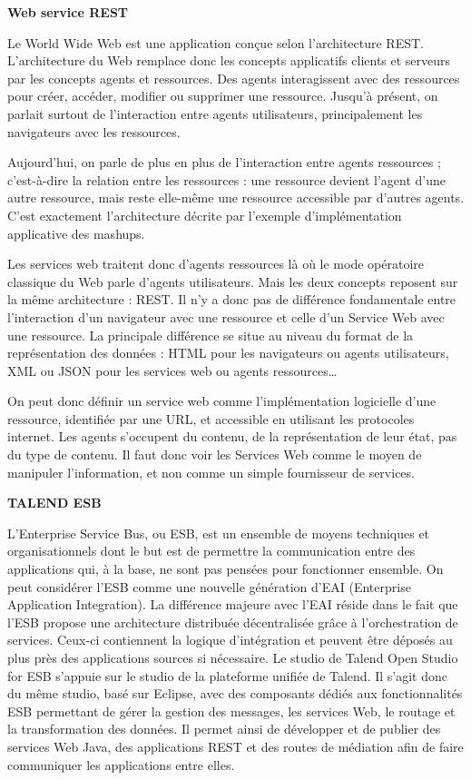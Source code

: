 \textbf{Web service REST}

Le World Wide Web est une application conçue selon l'architecture REST. L'architecture du Web remplace donc les concepts applicatifs clients et serveurs par les concepts agents et ressources. Des agents interagissent avec des ressources pour créer, accéder, modifier ou supprimer une ressource. Jusqu'à présent, on parlait surtout de l'interaction entre agents utilisateurs, principalement les navigateurs avec les ressources.

Aujourd'hui, on parle de plus en plus de l'interaction entre agents ressources ; c'est-à-dire la relation entre les ressources : une ressource devient l'agent d'une autre ressource, mais reste elle-même une ressource accessible par d'autres agents. C'est exactement l'architecture décrite par l'exemple d'implémentation applicative des mashups.

Les services web traitent donc d'agents ressources là où le mode opératoire classique du Web parle d'agents utilisateurs. Mais les deux concepts reposent sur la même architecture : REST.
Il n'y a donc pas de différence fondamentale entre l'interaction d'un navigateur avec une ressource et celle d'un Service Web avec une ressource. La principale différence se situe au niveau du format de la représentation des données : HTML pour les navigateurs ou agents utilisateurs, XML ou JSON pour les services web ou agents ressources…

On peut donc définir un service web comme l'implémentation logicielle d'une ressource, identifiée par une URL, et accessible en utilisant les protocoles internet. Les agents s'occupent du contenu, de la représentation de leur état, pas du type de contenu. Il faut donc voir les Services Web comme le moyen de manipuler l'information, et non comme un simple fournisseur de services.


\textbf{TALEND ESB}


L’Enterprise Service Bus, ou ESB, est un ensemble de moyens techniques et organisationnels dont le but est de permettre la communication entre des applications qui, à la base, ne sont pas pensées pour fonctionner ensemble.
 On peut considérer l’ESB comme une nouvelle génération d’EAI (Enterprise Application Integration). La différence majeure avec l’EAI réside dans le fait que l’ESB propose une architecture distribuée décentralisée grâce à l’orchestration de services. Ceux-ci contiennent la logique d’intégration et peuvent être déposés au plus près des applications sources si nécessaire.
Le studio de Talend Open Studio for ESB s’appuie sur le studio de la plateforme unifiée de Talend. Il s’agit donc du même studio, basé sur Eclipse, avec des composants dédiés aux fonctionnalités ESB permettant de gérer la gestion des messages, les services Web, le routage et la transformation des données. Il permet ainsi de développer et de publier des services Web Java, des applications REST et des routes de médiation afin de faire communiquer les applications entre elles.\cite{webservice}
 
